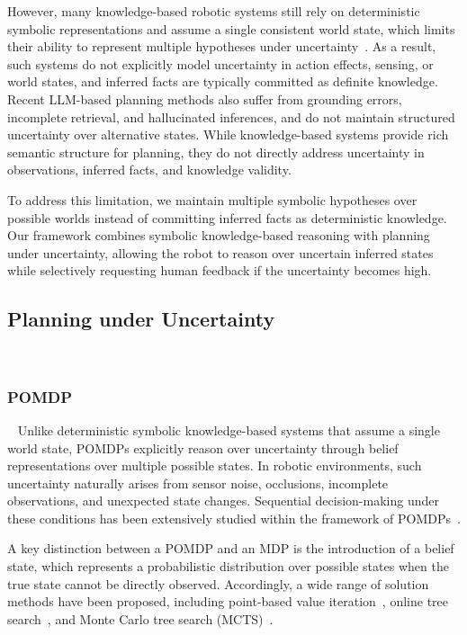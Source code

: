 However, many knowledge-based robotic systems still rely on deterministic symbolic representations and assume a single consistent world state, which limits their ability to represent multiple hypotheses under uncertainty~\cite{yang2018peorl,bouguerra2008monitoring}. As a result, such systems do not explicitly model uncertainty in action effects, sensing, or world states, and inferred facts are typically committed as definite knowledge. Recent LLM-based planning methods also suffer from grounding errors, incomplete retrieval, and hallucinated inferences, and do not maintain structured uncertainty over alternative states. While knowledge-based systems provide rich semantic structure for planning, they do not directly address uncertainty in observations, inferred facts, and knowledge validity. 


To address this limitation, we maintain multiple symbolic hypotheses over possible worlds instead of committing inferred facts as deterministic knowledge. Our framework combines symbolic knowledge-based reasoning with planning under uncertainty, allowing the robot to reason over uncertain inferred states while selectively requesting human feedback if the uncertainty becomes high.



\subsection{Planning under Uncertainty}~\label{rel:PlanningUncertainty}


\subsubsection{POMDP}~\label{rel:pu_pomdp}
Unlike deterministic symbolic knowledge-based systems that assume a single world state, POMDPs explicitly reason over uncertainty through belief representations over multiple possible states. In robotic environments, such uncertainty naturally arises from sensor noise, occlusions, incomplete observations, and unexpected state changes. Sequential decision-making under these conditions has been extensively studied within the framework of POMDPs~\cite{somani2013despot,bai2015intention,cramer2021probabilistic,bravo2019use}.

A key distinction between a POMDP and an MDP is the introduction of a belief state, which represents a probabilistic distribution over possible states when the true state cannot be directly observed. Accordingly, a wide range of solution methods have been proposed, including point-based value iteration~\cite{pineau2003point}, online tree search~\cite{ross2008online}, and Monte Carlo tree search (MCTS)~\cite{silver2010monte}.

